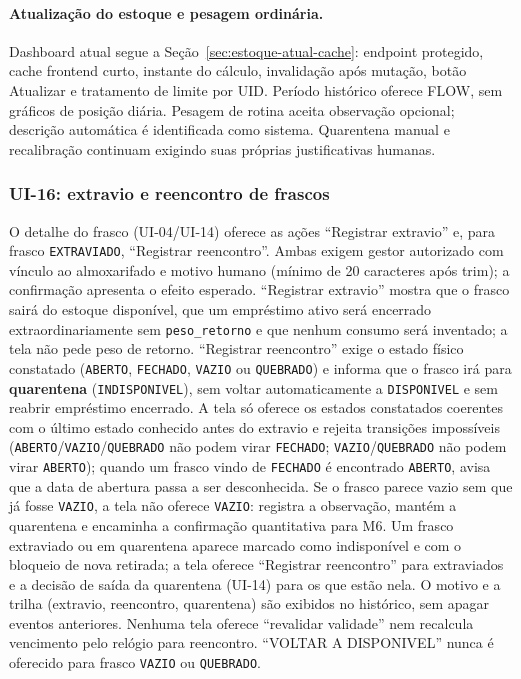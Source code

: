 \paragraph{Atualização do estoque e pesagem ordinária.}
Dashboard atual segue a Seção~\ref{sec:estoque-atual-cache}: endpoint protegido, cache frontend curto, instante do cálculo, invalidação após mutação, botão Atualizar e tratamento de limite por UID. Período histórico oferece FLOW, sem gráficos de posição diária. Pesagem de rotina aceita observação opcional; descrição automática é identificada como sistema. Quarentena manual e recalibração continuam exigindo suas próprias justificativas humanas.

\subsubsection{UI-16: extravio e reencontro de frascos}
O detalhe do frasco (UI-04/UI-14) oferece as ações ``Registrar extravio'' e, para frasco \texttt{EXTRAVIADO}, ``Registrar reencontro''. Ambas exigem gestor autorizado com vínculo ao almoxarifado e motivo humano (mínimo de 20 caracteres após trim); a confirmação apresenta o efeito esperado. ``Registrar extravio'' mostra que o frasco sairá do estoque disponível, que um empréstimo ativo será encerrado extraordinariamente sem \texttt{peso\_retorno} e que nenhum consumo será inventado; a tela não pede peso de retorno. ``Registrar reencontro'' exige o estado físico constatado (\texttt{ABERTO}, \texttt{FECHADO}, \texttt{VAZIO} ou \texttt{QUEBRADO}) e informa que o frasco irá para \textbf{quarentena} (\texttt{INDISPONIVEL}), sem voltar automaticamente a \texttt{DISPONIVEL} e sem reabrir empréstimo encerrado. A tela só oferece os estados constatados coerentes com o último estado conhecido antes do extravio e rejeita transições impossíveis (\texttt{ABERTO}/\texttt{VAZIO}/\texttt{QUEBRADO} não podem virar \texttt{FECHADO}; \texttt{VAZIO}/\texttt{QUEBRADO} não podem virar \texttt{ABERTO}); quando um frasco vindo de \texttt{FECHADO} é encontrado \texttt{ABERTO}, avisa que a data de abertura passa a ser desconhecida. Se o frasco parece vazio sem que já fosse \texttt{VAZIO}, a tela não oferece \texttt{VAZIO}: registra a observação, mantém a quarentena e encaminha a confirmação quantitativa para M6. Um frasco extraviado ou em quarentena aparece marcado como indisponível e com o bloqueio de nova retirada; a tela oferece ``Registrar reencontro'' para extraviados e a decisão de saída da quarentena (UI-14) para os que estão nela. O motivo e a trilha (extravio, reencontro, quarentena) são exibidos no histórico, sem apagar eventos anteriores. Nenhuma tela oferece ``revalidar validade'' nem recalcula vencimento pelo relógio para reencontro. ``VOLTAR A DISPONIVEL'' nunca é oferecido para frasco \texttt{VAZIO} ou \texttt{QUEBRADO}.

